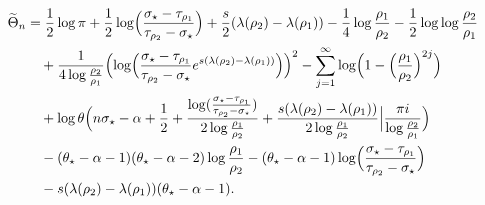 \documentclass[a4paper]{article}
\numberwithin{equation}{section}
\begin{document}
\begin{align}
\begin{split}
    \label{def of tilde Theta rewritten}
\widetilde{\Theta}_n&
=
\frac{1}{2}\log\pi
+\frac{1}{2}\log\Bigl(\frac{\sigma_{\star}-\tau_{\rho_1}}{\tau_{\rho_2}-\sigma_{\star}}\Bigr) 
+\frac{s}{2}(\lambda(\rho_2)-\lambda(\rho_1))
-\frac{1}{4}\log\frac{\rho_1}{\rho_2}
-\frac{1}{2}\log\log\frac{\rho_2}{\rho_1}
\\
&\quad
+\frac{1}{4\log\frac{\rho_2}{\rho_1}}
\Bigl(\log\Bigl(\frac{\sigma_{\star}-\tau_{\rho_1}}{\tau_{\rho_2}-\sigma_{\star}}e^{s(\lambda(\rho_2)-\lambda(\rho_1))}\Bigr)\Bigr)^2
-\sum_{j=1}^{\infty}\log\Bigl(1-\Bigl(\frac{\rho_1}{\rho_2}\Bigr)^{2j}\Bigr)
\\
&\quad
+\log\theta
\Bigl( 
n\sigma_{\star}-\alpha+\frac{1}{2}
+
\frac{\log(\frac{\sigma_{\star}-\tau_{\rho_1}}{\tau_{\rho_2}-\sigma_{\star}})}{2\log\frac{\rho_1}{\rho_2}}
+\frac{s(\lambda(\rho_2)-\lambda(\rho_1))}{2\log\frac{\rho_1}{\rho_2}}
\Bigr|\frac{\pi i}{\log\frac{\rho_2}{\rho_1}}
\Bigr)
\\
&\quad
-(\theta_{\star}-\alpha-1)(\theta_{\star}-\alpha-2)\log\frac{\rho_1}{\rho_2}
-(\theta_{\star}-\alpha-1)
\log\Bigl(\frac{\sigma_{\star}-\tau_{\rho_1}}{\tau_{\rho_2}-\sigma_{\star}}\Bigr) 
\\
&\quad
-s(\lambda(\rho_2)-\lambda(\rho_1))(\theta_{\star}-\alpha-1).
\end{split}
\end{align}








\end{document}
